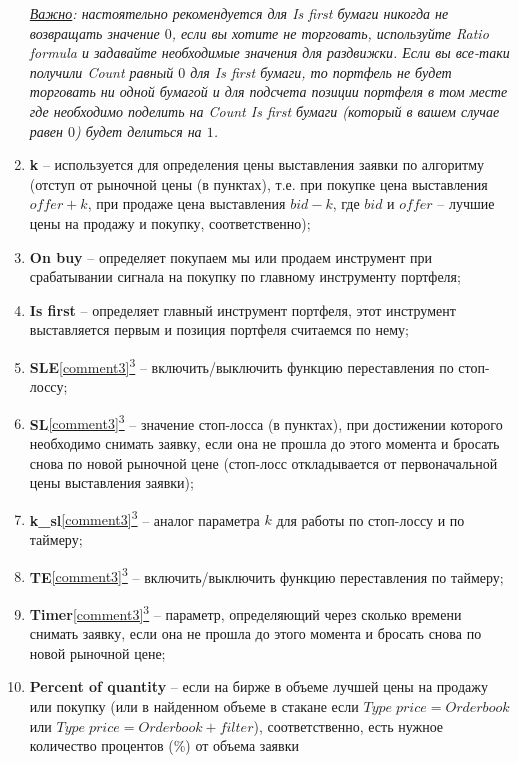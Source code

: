 \begin{enumerate}
		\textit{\underline{Важно}: настоятельно рекомендуется для \textit{Is first} бумаги никогда не возвращать значение $0$, если вы хотите не торговать,
		используйте \textit{Ratio formula} и задавайте необходимые значения для раздвижки. Если вы все-таки получили \textit{Count} равный $0$ для \textit{Is first}
		бумаги, то портфель не будет торговать ни одной бумагой и для подсчета позиции портфеля в том месте где необходимо поделить на \textit{Count}
		\textit{Is first} бумаги (который в вашем случае равен $0$) будет делиться на $1$.}
	\item \textbf{k} -- используется для определения цены выставления заявки по алгоритму (отступ от рыночной цены (в пунктах), т.е. при покупке цена выставления $offer + k$, при
		продаже цена выставления $bid - k$, где $bid$ и $offer$ -- лучшие цены на продажу и покупку, соответственно);
	\item \textbf{On buy} -- определяет покупаем мы или продаем инструмент при срабатывании сигнала на покупку по главному инструменту портфеля;
	\item \textbf{Is first} -- определяет главный инструмент портфеля, этот инструмент выставляется первым и позиция портфеля считаемся по нему;
	\item \textbf{SLE}\hyperref[comment3]{\ref{comment3}\textsuperscript{3}} -- включить/выключить функцию переставления по стоп-лоссу;
	\item \textbf{SL}\hyperref[comment3]{\ref{comment3}\textsuperscript{3}} -- значение стоп-лосса (в пунктах), при достижении которого необходимо снимать заявку, если она не прошла
		до этого момента и бросать снова
		по новой рыночной цене (стоп-лосс откладывается от первоначальной цены выставления заявки);	
	\item \textbf{k\_sl}\hyperref[comment3]{\ref{comment3}\textsuperscript{3}} -- аналог параметра $k$ для работы по стоп-лоссу и по таймеру;
	\item \textbf{TE}\hyperref[comment3]{\ref{comment3}\textsuperscript{3}} -- включить/выключить функцию переставления по таймеру;
	\item \textbf{Timer}\hyperref[comment3]{\ref{comment3}\textsuperscript{3}} -- параметр, определяющий через сколько времени снимать заявку, если она не прошла до этого
		момента и бросать снова по новой рыночной цене;
	\item \textbf{Percent of quantity} -- если на бирже в объеме лучшей цены на продажу или покупку (или в найденном объеме в стакане если $Type \; price = Orderbook$
		или $Type \; price = Orderbook + filter$), соответственно, есть нужное количество процентов (\%) от объема заявки

\end{enumerate}
